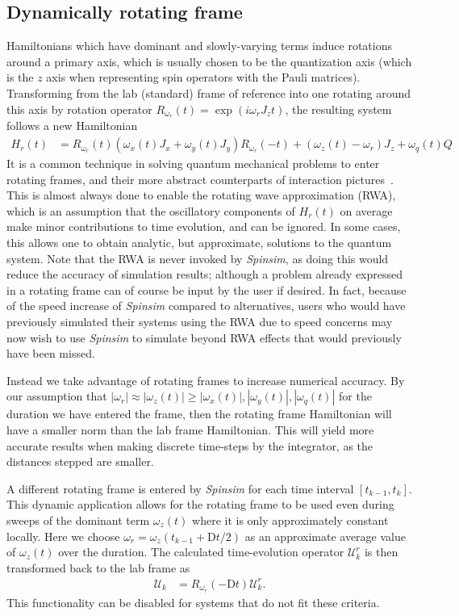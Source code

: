 \documentclass{jors}
\begin{document}
	\subsection{Dynamically rotating frame}\label{sec:rotating_frame}
		Hamiltonians which have dominant and slowly-varying terms induce rotations around a primary axis, which is usually chosen to be the quantization axis (which is the $ z $ axis when representing spin operators with the Pauli matrices).
		Transforming from the lab (standard) frame of reference into one rotating around this axis by rotation operator $ R_{\omega_r}(t) = \exp(i\omega_r J_z t) $, the resulting system follows a new Hamiltonian
		\begin{align}
			H_r(t) &= R_{\omega_r}(t) (\omega_x(t) J_x + \omega_y(t) J_y) R_{\omega_r}(-t) + (\omega_z(t) - \omega_r)J_z +\omega_q(t) Q
		\end{align}
		It is a common technique in solving quantum mechanical problems to enter rotating frames, and their more abstract counterparts of interaction pictures~\cite[(p336,338)]{j_j_sakurai_jun_john_modern_2011}.
		This is almost always done to enable the rotating wave approximation (RWA), which is an assumption that the oscillatory components of $ H_r(t) $ on average make minor contributions to time evolution, and can be ignored.
		In some cases, this allows one to obtain analytic, but approximate, solutions to the quantum system.
		Note that the RWA is never invoked by \emph{Spinsim}, as doing this would reduce the accuracy of simulation results; although a problem already expressed in a rotating frame can of course be input by the user if desired.
		In fact, because of the speed increase of \emph{Spinsim} compared to alternatives, users who would have previously simulated their systems using the RWA due to speed concerns may now wish to use \emph{Spinsim} to simulate beyond RWA effects that would previously have been missed.

		Instead we take advantage of rotating frames to increase numerical accuracy.
		By our assumption that $ |\omega_r| \approx |\omega_z(t)| \ge |\omega_x(t)|, |\omega_y(t)|, |\omega_q(t)| $ for the duration we have entered the frame, then the rotating frame Hamiltonian will have a smaller norm than the lab frame Hamiltonian.
		This will yield more accurate results when making discrete time-steps by the integrator, as the distances stepped are smaller.

		A different rotating frame is entered by \emph{Spinsim} for each time interval $ [t_{k - 1}, t_k] $.
		This dynamic application allows for the rotating frame to be used even during sweeps of the dominant term $ \omega_z(t) $ where it is only approximately constant locally.
		Here we choose $ \omega_r = \omega_z(t_{k - 1} + \mathrm{D}t/2) $ as an approximate average value of $ \omega_z(t) $ over the duration.
		The calculated time-evolution operator $ \mathcal{U}_k^r $ is then transformed back to the lab frame as
		\begin{align}
			\mathcal{U}_k &= R_{\omega_r}(-\mathrm{D}t)\mathcal{U}_k^r.\label{eq:exit_rotating_frame}
		\end{align}
		This functionality can be disabled for systems that do not fit these criteria.
\end{document}
